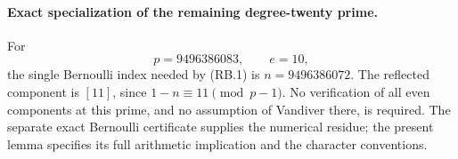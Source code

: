 \paragraph{Exact specialization of the remaining degree-twenty prime.}
For
\[
                 p=9496386083,\qquad e=10,
\]
the single Bernoulli index needed by (RB.1) is
$n=9496386072$. The reflected component is $[11]$, since
$1-n\equiv11\pmod{p-1}$. No verification of all even components at
this prime, and no assumption of Vandiver there, is required. The
separate exact Bernoulli certificate supplies the numerical residue;
the present lemma specifies its full arithmetic implication and the
character conventions.
